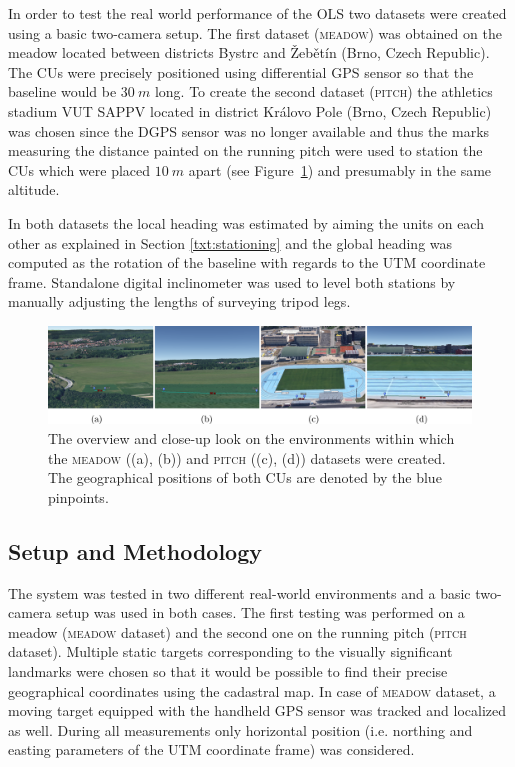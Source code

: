 In order to test the real world performance of the OLS two datasets were created using a basic two-camera setup. The first dataset (\textsc{meadow}) was obtained on the meadow located between districts Bystrc and Žebětín (Brno, Czech Republic). The CUs were precisely positioned using differential GPS sensor so that the baseline would be $30~m$ long. To create the second dataset (\textsc{pitch}) the athletics stadium VUT SAPPV located in district Královo Pole (Brno, Czech Republic) was chosen since the DGPS sensor was no longer available and thus the marks measuring the distance painted on the running pitch were used to station the CUs which were placed $10~m$ apart (see Figure~\ref{fig:dataset_zebetin_vut}) and presumably in the same altitude.

In both datasets the local heading was estimated by aiming the units on each other as explained in Section \ref{txt:stationing} and the global heading was computed as the rotation of the baseline with regards to the UTM coordinate frame. Standalone digital inclinometer was used to level both stations by manually adjusting the lengths of surveying tripod legs.

\begin{figure}[htb]\centering
	\centering
	\includegraphics[width=0.98\linewidth]{fig/dataset_zebetin_vut.png}
	\caption{The overview and close-up look on the environments within which the \textsc{meadow} ((a), (b)) and \textsc{pitch} ((c), (d)) datasets were created. The geographical positions of both CUs are denoted by the blue pinpoints.}
	\label{fig:dataset_zebetin_vut}
\end{figure}

\subsection{Setup and Methodology} \label{txt:setup_and_methodology}

The system was tested in two different real-world environments and a basic two-camera setup was used in both cases. The first testing was performed on a meadow (\textsc{meadow} dataset) and the second one on the running pitch (\textsc{pitch} dataset). Multiple static targets corresponding to the visually significant landmarks were chosen so that it would be possible to find their precise geographical coordinates using the cadastral map. In case of \textsc{meadow} dataset, a moving target equipped with the handheld GPS sensor was tracked and localized as well. During all measurements only horizontal position (i.e. northing and easting parameters of the UTM coordinate frame) was considered.

